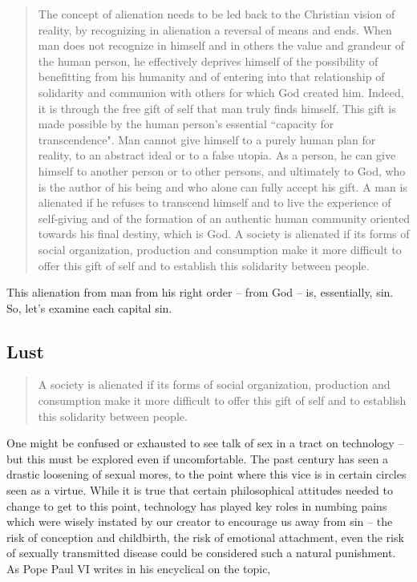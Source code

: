 \documentclass[letterpaper]{article}
\begin{document}
\begin{quote}
    The concept of alienation needs to be led back to the Christian vision of reality, by recognizing in alienation a reversal of means and ends. When man does not recognize in himself and in others the value and grandeur of the human person, he effectively deprives himself of the possibility of benefitting from his humanity and of entering into that relationship of solidarity and communion with others for which God created him. Indeed, it is through the free gift of self that man truly finds himself. This gift is made possible by the human person's essential ``capacity for transcendence". Man cannot give himself to a purely human plan for reality, to an abstract ideal or to a false utopia. As a person, he can give himself to another person or to other persons, and ultimately to God, who is the author of his being and who alone can fully accept his gift. A man is alienated if he refuses to transcend himself and to live the experience of self-giving and of the formation of an authentic human community oriented towards his final destiny, which is God. A society is alienated if its forms of social organization, production and consumption make it more difficult to offer this gift of self and to establish this solidarity between people.
  \end{quote}

  This alienation from man from his right order -- from God -- is, essentially, sin. So, let's examine each capital sin.

  \subsection{Lust}

    \begin{quote}
      A society is alienated if its forms of social organization, production and consumption make it more difficult to offer this gift of self and to establish this solidarity between people.
    \end{quote}

    One might be confused or exhausted to see talk of sex in a tract on technology -- but this must be explored even if uncomfortable. The past century has seen a drastic loosening of sexual mores, to the point where this vice is in certain circles seen as a virtue. While it is true that certain philosophical attitudes needed to change to get to this point, technology has played key roles in numbing pains which were wisely instated by our creator to encourage us away from sin -- the risk of conception and childbirth, the risk of emotional attachment, even the risk of sexually transmitted disease could be considered such a natural punishment. As Pope Paul VI writes in his encyclical on the topic,
\end{document}
